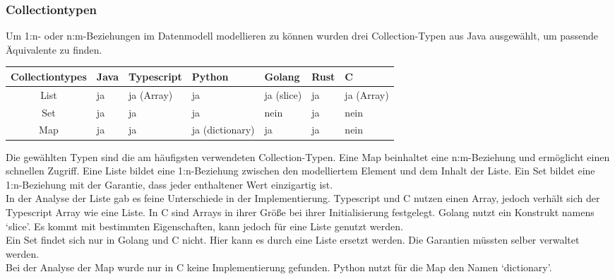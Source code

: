 \documentclass[./einleitung.tex]{subfiles}
\begin{document}
    \subsubsection{Collectiontypen}
    Um 1:n- oder n:m-Beziehungen im Datenmodell modellieren zu können wurden drei Collection-Typen aus Java ausgewählt, um passende Äquivalente zu finden.
    \begin{center}
        \begin{tabular}{| c || m{3em} | m{4.5em} | m{5.5em} | m{4.5em} | m{3em} | m{4.5em} |}
            \hline
            Collectiontypes & Java & Typescript & Python          & Golang     & Rust & C          \\
            \hline
            List            & ja   & ja (Array) & ja              & ja (slice) & ja   & ja (Array) \\
            \hline
            Set             & ja   & ja         & ja              & nein       & ja   & nein       \\
            \hline
            Map             & ja   & ja         & ja (dictionary) & ja         & ja   & nein       \\
            \hline

        \end{tabular}
    \end{center}
    Die gewählten Typen sind die am häufigsten verwendeten Collection-Typen.
    Eine Map beinhaltet eine n:m-Beziehung und ermöglicht einen schnellen Zugriff.
    Eine Liste bildet eine 1:n-Beziehung zwischen den modelliertem Element und dem Inhalt der Liste.
    Ein Set bildet eine 1:n-Beziehung mit der Garantie, dass jeder enthaltener Wert einzigartig ist. \\

    In der Analyse der Liste gab es feine Unterschiede in der Implementierung.
    Typescript und C nutzen einen Array, jedoch verhält sich der Typescript Array wie eine Liste.
    In C sind Arrays in ihrer Größe bei ihrer Initialisierung festgelegt.
    Golang nutzt ein Konstrukt namens `slice'.
    Es kommt mit bestimmten Eigenschaften, kann jedoch für eine Liste genutzt werden. \\

    Ein Set findet sich nur in Golang und C nicht.
    Hier kann es durch eine Liste ersetzt werden.
    Die Garantien müssten selber verwaltet werden. \\

    Bei der Analyse der Map wurde nur in C keine Implementierung gefunden.
    Python nutzt für die Map den Namen `dictionary'.
\end{document}
